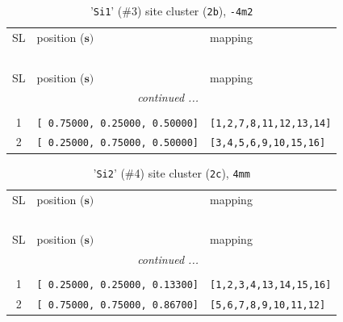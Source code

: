 \documentclass[fleqn,10pt,landscape]{jsarticle}
\begin{document}
\renewcommand{\arraystretch}{1.6}
\begin{longtable}[l]{cll}
\captionsetup{justification=raggedright, singlelinecheck=off}
\caption{'\texttt{Si1}' (\#3) site cluster (\texttt{2b}), \texttt{-4m2}}
 \\
 \hline \hline
SL & position ($\bm{s})$ & mapping \\ \hline \endfirsthead

\multicolumn{2}{l}{\tablename\ \thetable{}} \\
 \hline \hline
SL & position ($\bm{s})$ & mapping \\ \hline \endhead

 \hline \hline
\multicolumn{2}{r}{\footnotesize\it continued ...} \\ \endfoot

 \hline \hline
\multicolumn{2}{r}{} \\ \endlastfoot

1 & \texttt{[ 0.75000, 0.25000, 0.50000]} & \texttt{[1,2,7,8,11,12,13,14]} \\ \hline
2 & \texttt{[ 0.25000, 0.75000, 0.50000]} & \texttt{[3,4,5,6,9,10,15,16]} \\
\end{longtable}
\renewcommand{\arraystretch}{1.6}
\begin{longtable}[l]{cll}
\captionsetup{justification=raggedright, singlelinecheck=off}
\caption{'\texttt{Si2}' (\#4) site cluster (\texttt{2c}), \texttt{4mm}}
 \\
 \hline \hline
SL & position ($\bm{s})$ & mapping \\ \hline \endfirsthead

\multicolumn{2}{l}{\tablename\ \thetable{}} \\
 \hline \hline
SL & position ($\bm{s})$ & mapping \\ \hline \endhead

 \hline \hline
\multicolumn{2}{r}{\footnotesize\it continued ...} \\ \endfoot

 \hline \hline
\multicolumn{2}{r}{} \\ \endlastfoot

1 & \texttt{[ 0.25000, 0.25000, 0.13300]} & \texttt{[1,2,3,4,13,14,15,16]} \\ \hline
2 & \texttt{[ 0.75000, 0.75000, 0.86700]} & \texttt{[5,6,7,8,9,10,11,12]} \\
\end{longtable}
\renewcommand{\arraystretch}{1.6}
\end{document}
